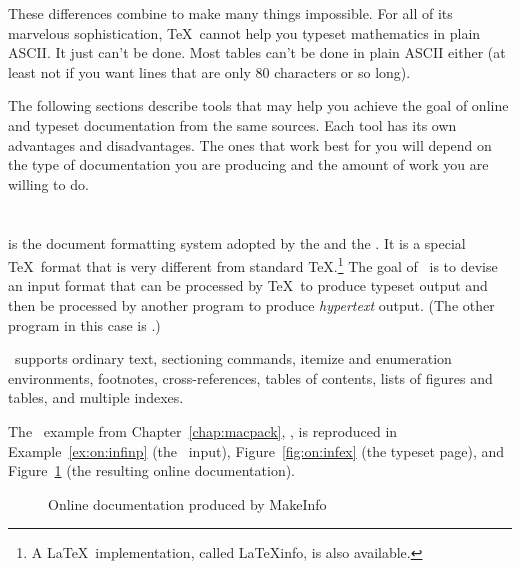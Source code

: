 These differences combine to make many things impossible.  For all of
its marvelous sophistication, \TeX\ cannot help you 
typeset mathematics in 
plain ASCII.  It just can't be done.  Most tables can't be done in
plain ASCII either (at least not if you want lines that are only 80 characters
or so long).

The following sections describe tools that may help you achieve the
goal of online and typeset documentation from the same sources.  Each
tool has its own advantages and disadvantages. The ones that work best
for you will depend on the type of documentation you are producing
and the amount of work you are willing to do.

\section{\protect\TeXinfo}

 is the document formatting system adopted by the
 and the .  It is 
a special \TeX\ format
that is very different from standard \TeX.\footnote{A \LaTeX\
implementation, called \LaTeX{}info, is also available.}  The goal of
\TeXinfo\ is to devise an input format that can be processed by
\TeX\ to produce typeset output and then be processed by another program to
produce \emph{hypertext} output.  (The other program in this case is
\ixx{\program{MakeInfo}}{MakeInfo}.)

\TeXinfo\ supports ordinary text, sectioning commands, itemize and
enumeration environments, footnotes, cross-references, tables of
contents, lists of figures and tables, and multiple indexes.

The \TeXinfo\ example from Chapter~\ref{chap:macpack},
{\it {}}, is reproduced in Example~\ref{ex:on:infinp}
(the \TeXinfo\ input), Figure~\ref{fig:on:infex} (the typeset page), 
and Figure~\ref{fig:on:infinf} (the resulting online documentation).



\begin{figure}
  \begin{center}
    \caption{Online documentation produced by MakeInfo}
    \label{fig:on:infinf}
  \end{center}
\end{figure}

